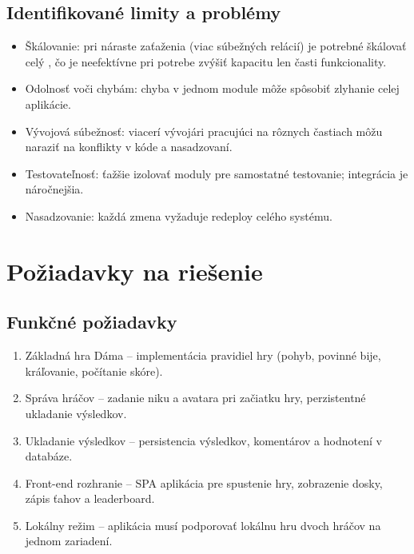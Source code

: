 \subsection{Identifikované limity a problémy}
\begin{itemize}
    \item Škálovanie: pri náraste zaťaženia (viac súbežných relácií) je potrebné škálovať celý , čo je neefektívne pri potrebe zvýšiť kapacitu len časti funkcionality.
    \item Odolnosť voči chybám: chyba v jednom module môže spôsobiť zlyhanie celej aplikácie.
    \item Vývojová súbežnosť: viacerí vývojári pracujúci na rôznych častiach môžu naraziť na konflikty v kóde a nasadzovaní.
    \item Testovateľnosť: ťažšie izolovať moduly pre samostatné testovanie; integrácia je náročnejšia.
    \item Nasadzovanie: každá zmena vyžaduje redeploy celého systému.
\end{itemize}

\section{Požiadavky na riešenie}
\subsection{Funkčné požiadavky}
\begin{enumerate}
    \item Základná hra Dáma – implementácia pravidiel hry (pohyb, povinné bije, kráľovanie, počítanie skóre).
    \item Správa hráčov – zadanie niku a avatara pri začiatku hry, perzistentné ukladanie výsledkov.
    \item Ukladanie výsledkov – persistencia výsledkov, komentárov a hodnotení v databáze.
    \item Front-end rozhranie –  SPA aplikácia pre spustenie hry, zobrazenie dosky, zápis ťahov a leaderboard.
    \item Lokálny režim – aplikácia musí podporovať lokálnu hru dvoch hráčov na jednom zariadení.
\end{enumerate}

